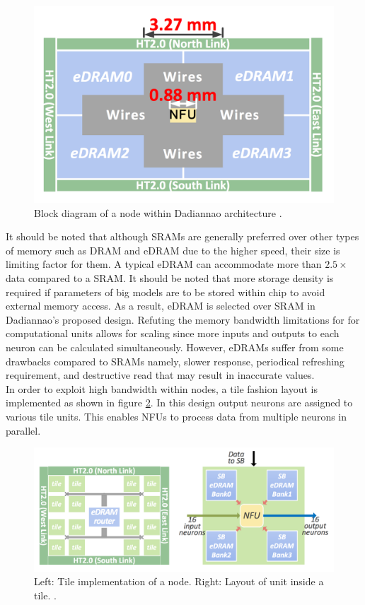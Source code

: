 \documentclass[runningheads,a4paper]{llncs}
\begin{document}
{\begin{figure}[h]
	\includegraphics[scale=0.42]{./images/NFU_diagram.png}
	\centering
	\caption{Block diagram of a node within Dadiannao architecture \cite{chen2014dadiannao}.}
	\label{fig:NFU_Diagram}
\end{figure}
It should be noted that although SRAMs are generally preferred over other types of memory such as DRAM and eDRAM due to the higher speed, their size is limiting factor for them. A typical eDRAM can accommodate more than $2.5\times$ data compared to a SRAM. It should be noted that more storage density is required if parameters of big models are to be stored within chip to avoid external memory access. As a result, eDRAM is selected over SRAM in Dadiannao's proposed design. Refuting the memory bandwidth limitations for for computational units allows for scaling since more inputs and outputs to each neuron can be calculated simultaneously. However, eDRAMs suffer from some drawbacks compared to SRAMs namely, slower response, periodical refreshing requirement, and destructive read that may result in inaccurate values.\\

In order to exploit high bandwidth within nodes, a tile fashion layout is implemented as shown in figure \ref{fig:tiles}. In this design output neurons are assigned to various tile units. This enables NFUs to process data from multiple neurons in parallel.
\begin{figure}[h]
	\includegraphics[scale=0.42]{./images/tiles.png}
	\centering
	\caption{Left: Tile implementation of a node. Right: Layout of unit inside a tile. \cite{chen2014dadiannao}.}
	\label{fig:tiles}
\end{figure}

}
\end{document}

